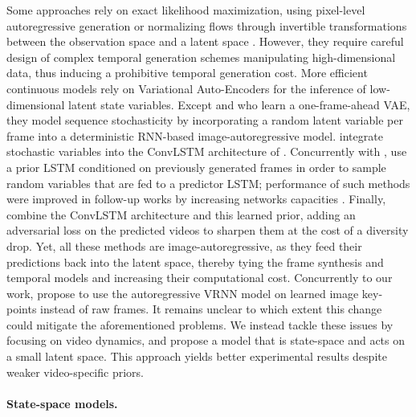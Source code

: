 \documentclass{article}
\begin{document}
Some approaches rely on exact likelihood maximization, using pixel-level autoregressive generation \citep{Oord2016, Kalchbrenner2017, Weissenborn2020} or normalizing flows through invertible transformations between the observation space and a latent space \citep{Kingma2018, Kumar2020}.
However, they require careful design of complex temporal generation schemes manipulating high-dimensional data, thus inducing a prohibitive temporal generation cost.
More efficient continuous models rely on Variational Auto-Encoders \citep[VAEs,][]{Kingma2014, Rezende2014} for the inference of low-dimensional latent state variables.
Except \citet{Xue2016} and \citet{Liu2018} who learn a one-frame-ahead VAE, they model sequence stochasticity by incorporating a random latent variable per frame into a deterministic RNN-based image-autoregressive model.
\citet{Babaeizadeh2018} integrate stochastic variables into the ConvLSTM architecture of \citet{Finn2016}.
Concurrently with \citet{He2018}, \citet{Denton2018} use a prior LSTM conditioned on previously generated frames in order to sample random variables that are fed to a predictor LSTM; performance of such methods were improved in follow-up works by increasing networks capacities \citep{Castrejon2019, Villegas2019}.
Finally, \citet{Lee2018} combine the ConvLSTM architecture and this learned prior, adding an adversarial loss on the predicted videos to sharpen them at the cost of a diversity drop.
Yet, all these methods are image-autoregressive, as they feed their predictions back into the latent space, thereby tying the frame synthesis and temporal models and increasing their computational cost.
Concurrently to our work, \citet{Minderer2019} propose to use the autoregressive VRNN model \citep{Chung2015} on learned image key-points instead of raw frames.
It remains unclear to which extent this change could mitigate the aforementioned problems.
We instead tackle these issues by focusing on video dynamics, and propose a model that is state-space and acts on a small latent space.
This approach yields better experimental results despite weaker video-specific priors.

\paragraph{State-space models.}
\end{document}
